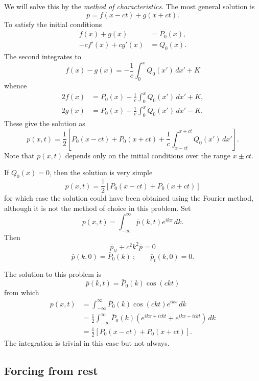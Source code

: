 We will solve this by the \emph{method of characteristics}. The most general solution is
\[
	p=f(x-ct)+g(x+ct).
\]
To satisfy the initial conditions
\begin{align*}
	f(x)+g(x)      & =P_0(x), \\
	-cf'(x)+cg'(x) & =Q_0(x).
\end{align*}
The second integrates to
\[
	f(x)-g(x)=-\frac1c\int_0^x Q_0(x')\,dx'+K
\]
whence
\begin{align*}
	2f(x) & =P_0(x)-\frac1c\int_0^x Q_0(x')\,dx'+K, \\
	2g(x) & =P_0(x)+\frac1c\int_0^x Q_0(x')\,dx'-K.
\end{align*}
These give the solution as
\[
	p(x,t)=\frac12\left[P_0(x-ct)+P_0(x+ct)
		+\frac1c\int_{x-ct}^{x+ct}Q_0(x')\,dx'\right].
\]
Note that $p(x,t)$ depends only on the initial conditions over the range $x\pm ct$.

If $Q_0(x)=0$, then the solution is very simple
\[
	p(x,t)=\frac12[P_0(x-ct)+P_0(x+ct)]
\]
for which case the solution could have been obtained using the Fourier method,
although it is not the method of choice in this problem. Set
\[
	p(x,t)=\int_{-\infty}^{\infty}\bar p(k,t)e^{ikx}\,dk.
\]
Then
\[
	\bar p_{tt}+c^2k^2\bar p=0
\]
\[
	\bar p(k,0)=\bar P_0(k)\ ;\qquad \bar p_t(k,0)=0.
\]

\sourcepagebreak

The solution to this problem is
\[
	\bar p(k,t)=\bar P_0(k)\cos(ckt)
\]
from which
\begin{align*}
	p(x,t)
	 & =\int_{-\infty}^{\infty}\bar P_0(k)\cos(ckt)e^{ikx}\,dk \\
	 & =\frac12\int_{-\infty}^{\infty}\bar P_0(k)
	\left(e^{ikx+ickt}+e^{ikx-ickt}\right)\,dk                 \\
	 & =\frac12[P_0(x-ct)+P_0(x+ct)].
\end{align*}
The integration is trivial in this case but not always.

\subsection{Forcing from rest}

